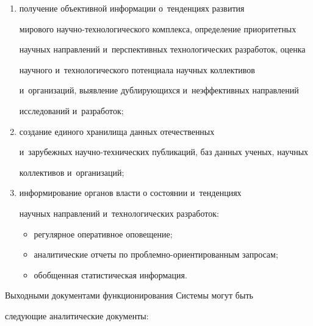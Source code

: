      \begin{enumerate}[(1)]


     \item получение объективной информации о~тенденциях развития 


мирового на\-уч\-но-тех\-но\-ло\-ги\-че\-ско\-го комплекса, определение приоритетных 


научных направлений и~перспективных технологических разработок, оценка 


научного и~технологического потенциала научных коллективов 


и~организаций, выявление дублирующихся и~неэффективных направлений 


исследований и~разработок;


     \item создание единого хранилища данных отечественных 


и~зарубежных научно-технических публикаций, баз данных ученых, научных 


коллективов и~организаций; 


     \item информирование органов власти о состоянии и~тенденциях 


научных на\-прав\-ле\-ний и~технологических разработок:


     \begin{itemize}


\item регулярное оперативное оповещение;


\item аналитические отчеты по проб\-лем\-но-ориен\-ти\-ро\-ван\-ным запросам;


\item обобщенная статистическая информация. 


\end{itemize}


\end{enumerate}


     


     Выходными документами функционирования Системы могут быть 


следующие аналитические документы:


